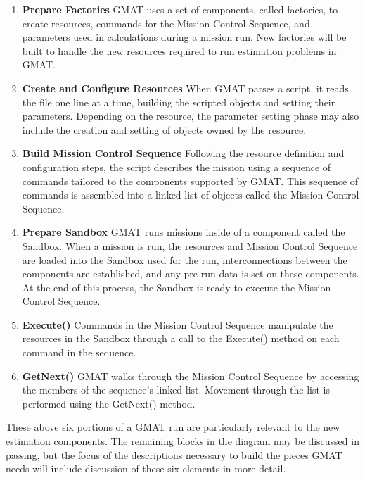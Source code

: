 \begin{enumerate}
\item \textbf{Prepare Factories}  GMAT uses a set of components, called factories, to create
resources, commands for the Mission Control Sequence, and parameters used in calculations during a
mission run. New factories will be built to handle the new resources required to run estimation
problems in GMAT.
\item \textbf{Create and Configure Resources}  When GMAT parses a script, it reads the file one line
at a time, building the scripted objects and setting their parameters.  Depending on the resource,
the parameter setting phase may also include the creation and setting of objects owned by the
resource.
\item \textbf{Build Mission Control Sequence}  Following the resource definition and configuration
steps, the script describes the mission using a sequence of commands tailored to the components
supported by GMAT.  This sequence of commands is assembled into a linked list of objects called the
Mission Control Sequence.
\item \textbf{Prepare Sandbox}  GMAT runs missions inside of a component called the Sandbox.  When a
mission is run, the resources and Mission Control Sequence are loaded into the Sandbox used for the
run, interconnections between the components are established, and any pre-run data is set on these
components.  At the end of this process, the Sandbox is ready to execute the Mission Control
Sequence.
\item \textbf{Execute()}  Commands in the Mission Control Sequence manipulate the resources in the
Sandbox through a call to the Execute() method on each command in the sequence.
\item \textbf{GetNext()}  GMAT walks through the Mission Control Sequence by accessing the members
of the sequence's linked list.  Movement through the list is performed using the GetNext() method.
\end{enumerate}

These above six portions of a GMAT run are particularly relevant to the new estimation components.
The remaining blocks in the diagram may be discussed in passing, but the focus of the descriptions
necessary to build the pieces GMAT needs will include discussion of these six elements in more
detail.

